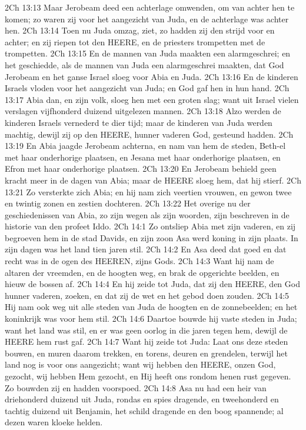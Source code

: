 2Ch 13:13  Maar Jerobeam deed een achterlage omwenden, om van achter hen te komen; zo waren zij voor het aangezicht van Juda, en de achterlage was achter hen.
2Ch 13:14  Toen nu Juda omzag, ziet, zo hadden zij den strijd voor en achter; en zij riepen tot den HEERE, en de priesters trompetten met de trompetten.
2Ch 13:15  En de mannen van Juda maakten een alarmgeschrei; en het geschiedde, als de mannen van Juda een alarmgeschrei maakten, dat God Jerobeam en het ganse Israel sloeg voor Abia en Juda.
2Ch 13:16  En de kinderen Israels vloden voor het aangezicht van Juda; en God gaf hen in hun hand.
2Ch 13:17  Abia dan, en zijn volk, sloeg hen met een groten slag; want uit Israel vielen verslagen vijfhonderd duizend uitgelezen mannen.
2Ch 13:18  Alzo werden de kinderen Israels vernederd te dier tijd; maar de kinderen van Juda werden machtig, dewijl zij op den HEERE, hunner vaderen God, gesteund hadden.
2Ch 13:19  En Abia jaagde Jerobeam achterna, en nam van hem de steden, Beth-el met haar onderhorige plaatsen, en Jesana met haar onderhorige plaatsen, en Efron met haar onderhorige plaatsen.
2Ch 13:20  En Jerobeam behield geen kracht meer in de dagen van Abia; maar de HEERE sloeg hem, dat hij stierf.
2Ch 13:21  Zo versterkte zich Abia; en hij nam zich veertien vrouwen, en gewon twee en twintig zonen en zestien dochteren.
2Ch 13:22  Het overige nu der geschiedenissen van Abia, zo zijn wegen als zijn woorden, zijn beschreven in de historie van den profeet Iddo.
2Ch 14:1  Zo ontsliep Abia met zijn vaderen, en zij begroeven hem in de stad Davids, en zijn zoon Asa werd koning in zijn plaats. In zijn dagen was het land tien jaren stil.
2Ch 14:2  En Asa deed dat goed en dat recht was in de ogen des HEEREN, zijns Gods.
2Ch 14:3  Want hij nam de altaren der vreemden, en de hoogten weg, en brak de opgerichte beelden, en hieuw de bossen af.
2Ch 14:4  En hij zeide tot Juda, dat zij den HEERE, den God hunner vaderen, zoeken, en dat zij de wet en het gebod doen zouden.
2Ch 14:5  Hij nam ook weg uit alle steden van Juda de hoogten en de zonnebeelden; en het koninkrijk was voor hem stil.
2Ch 14:6  Daartoe bouwde hij vaste steden in Juda; want het land was stil, en er was geen oorlog in die jaren tegen hem, dewijl de HEERE hem rust gaf.
2Ch 14:7  Want hij zeide tot Juda: Laat ons deze steden bouwen, en muren daarom trekken, en torens, deuren en grendelen, terwijl het land nog is voor ons aangezicht; want wij hebben den HEERE, onzen God, gezocht, wij hebben Hem gezocht, en Hij heeft ons rondom henen rust gegeven. Zo bouwden zij en hadden voorspoed.
2Ch 14:8  Asa nu had een heir van driehonderd duizend uit Juda, rondas en spies dragende, en tweehonderd en tachtig duizend uit Benjamin, het schild dragende en den boog spannende; al dezen waren kloeke helden.
